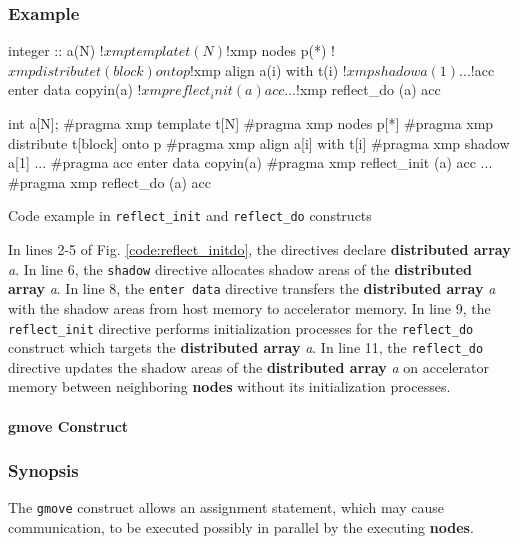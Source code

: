 \subsubsection*{Example}
\begin{myfigure}
\begin{minipage}{0.45\hsize}
\begin{center}
\begin{XACCFexampleL}
integer :: a(N)
!$xmp template t(N)
!$xmp nodes p(*)
!$xmp distribute t(block) onto p
!$xmp align a(i) with t(i)
!$xmp shadow a(1)
...
!$acc enter data copyin(a)
!$xmp reflect_init (a) acc
...
!$xmp reflect_do (a) acc
\end{XACCFexampleL}
\end{center}
\end{minipage}
%
\begin{minipage}{0.53\hsize}
\begin{center}
\begin{XACCCexampleR}
int a[N];
#pragma xmp template t[N]
#pragma xmp nodes p[*]
#pragma xmp distribute t[block] onto p
#pragma xmp align a[i] with t[i]
#pragma xmp shadow a[1]
...
#pragma acc enter data copyin(a)
#pragma xmp reflect_init (a) acc
...
#pragma xmp reflect_do (a) acc
\end{XACCCexampleR}
\end{center}
\end{minipage}
\caption{Code example in {\tt reflect\_init} and {\tt reflect\_do} constructs}\label{code:reflect_initdo}
\end{myfigure}

In lines 2-5 of Fig. \ref{code:reflect_initdo},
the directives declare {\bf distributed array} {\it a}.
In line 6,
the {\tt shadow} directive allocates shadow areas of the {\bf distributed array} {\it a}.
In line 8,
the {\tt enter data} directive transfers the {\bf distributed array} {\it a} with the shadow areas from host memory to accelerator memory.
In line 9,
the {\tt reflect\_init} directive performs initialization processes for the {\tt reflect\_do} construct which targets the {\bf distributed array} {\it a}.
In line 11,
the {\tt reflect\_do} directive updates the shadow areas of the {\bf distributed array} {\it a} on accelerator memory between neighboring {\bf nodes}
without its initialization processes.

\paragraph{gmove Construct}\label{sec:gmove}
\subsubsection*{Synopsis}
The {\tt gmove} construct allows an assignment statement,
which may cause communication, to be executed possibly in parallel by
the executing {\bf nodes}.

